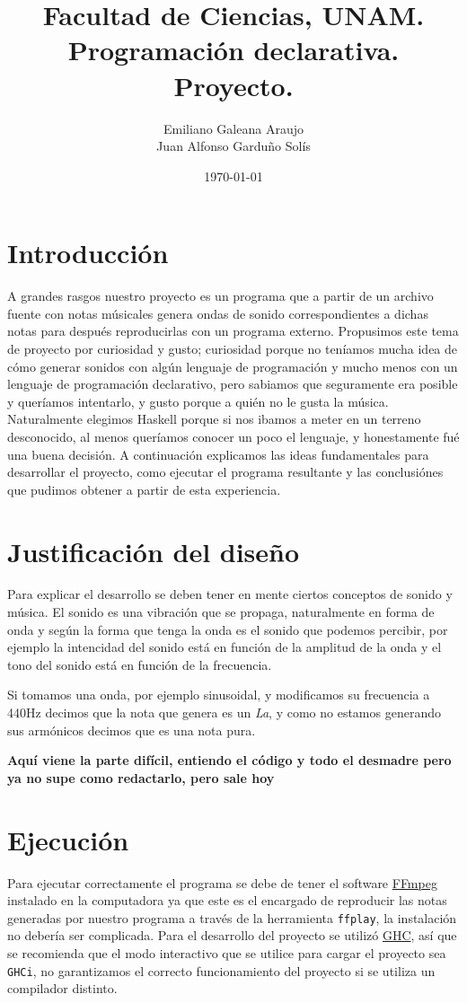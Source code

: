 \documentclass[10pt,a4paper]{article}
\title{Facultad de Ciencias, UNAM.\\Programación declarativa.\\ Proyecto.}
\author{Emiliano Galeana Araujo\\ Juan Alfonso Garduño Solís}
\date{\today}
\begin{document}
\maketitle
\section{Introducción}
\noindent A grandes rasgos nuestro proyecto es un programa que a partir de un
archivo fuente con notas músicales genera ondas de sonido correspondientes a
dichas notas  para después reproducirlas con un programa externo. Propusimos este
tema de proyecto por curiosidad y gusto; curiosidad porque no teníamos mucha idea
de cómo generar sonidos con algún lenguaje de programación y mucho menos con un
lenguaje de programación declarativo, pero sabiamos que seguramente era posible y
queríamos intentarlo, y gusto porque a quién no le gusta la música. Naturalmente
elegimos Haskell porque si nos ibamos a meter en un terreno desconocido, al menos
queríamos conocer un poco el lenguaje, y honestamente fué una buena decisión. A
continuación explicamos las ideas fundamentales para desarrollar el proyecto,
como ejecutar el programa resultante y las conclusiónes que pudimos obtener a
partir de esta experiencia. 

\section{Justificación del diseño}
\noindent Para explicar el desarrollo se deben tener en mente ciertos conceptos
de sonido y música. El sonido es una vibración que se propaga, naturalmente en
forma de onda y según la forma que tenga la onda es el sonido que podemos
percibir, por ejemplo la intencidad del sonido está en función de la amplitud de
la onda y el tono del sonido está en función de la frecuencia.

Si tomamos una onda, por ejemplo sinusoidal, y modificamos su frecuencia a 440Hz
decimos que la nota que genera es un \textit{La}, y como no estamos generando sus
armónicos decimos que es una nota pura.



\textbf{Aquí viene la parte difícil, entiendo el código y todo el desmadre pero ya no supe como redactarlo, pero sale hoy}

\section{Ejecución}
\noindent Para ejecutar correctamente el programa se debe de tener el software
\href{https://ffmpeg.org/}{FFmpeg} instalado en la computadora ya que este es el
encargado de reproducir las notas generadas por nuestro programa a través de la
herramienta \texttt{ffplay}, la instalación no debería ser complicada. Para el
desarrollo del proyecto se utilizó \href{https://www.haskell.org/ghc/}{GHC}, así
que se recomienda que el modo interactivo que se utilice para cargar el proyecto
sea \texttt{GHCi}, no garantizamos el correcto funcionamiento del proyecto si se
utiliza un compilador distinto.
\end{document}
